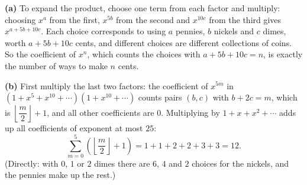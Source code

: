 \textbf{(a)} To expand the product, choose one term from each factor and multiply: choosing $x^a$ from the first, $x^{5b}$ from the second and $x^{10c}$ from the third gives $x^{a+5b+10c}$. Each choice corresponds to using $a$ pennies, $b$ nickels and $c$ dimes, worth $a+5b+10c$ cents, and different choices are different collections of coins. So the coefficient of $x^n$, which counts the choices with $a+5b+10c=n$, is exactly the number of ways to make $n$ cents.

\textbf{(b)} First multiply the last two factors: the coefficient of $x^{5m}$ in $\left(1+x^5+x^{10}+\cdots\right)\left(1+x^{10}+\cdots\right)$ counts pairs $(b,c)$ with $b+2c=m$, which is $\left\lfloor\dfrac m2\right\rfloor+1$, and all other coefficients are $0$. Multiplying by $1+x+x^2+\cdots$ adds up all coefficients of exponent at most $25$:
\[\sum_{m=0}^{5}\left(\left\lfloor\dfrac m2\right\rfloor+1\right)=1+1+2+2+3+3=\boxed{12}.\]
(Directly: with $0$, $1$ or $2$ dimes there are $6$, $4$ and $2$ choices for the nickels, and the pennies make up the rest.)
